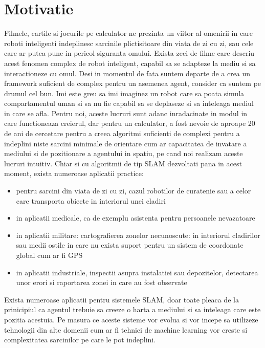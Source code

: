 \documentclass[12pt,a4paper]{report}
\begin{document}
\section{Motivatie}
Filmele, cartile si jocurile pe calculator ne prezinta un viitor al omenirii in care
roboti inteligenti indeplinesc sarcinile plictisitoare din viata de zi cu zi, sau cele 
care ar putea pune in pericol siguranta omului. Exista zeci de filme care descriu 
acest fenomen complex de robot inteligent, capabil sa se adapteze la mediu si sa 
interactioneze cu omul. Desi in momentul de fata suntem departe de a crea un framework 
suficient de complex pentru un asemenea agent, consider ca suntem pe drumul cel bun. 
Imi este greu sa imi imaginez un robot care sa poata simula compartamentul uman si sa 
nu fie capabil sa se deplaseze si sa inteleaga mediul in care se afla. Pentru noi, 
aceste lucruri sunt adanc inradacinate in modul in care functioneaza creierul, dar pentru
un calculator, a fost nevoie de aproape 20 de ani de cercetare pentru a creea algoritmi 
suficienti de complexi pentru a indeplini niste sarcini minimale de orientare cum ar 
capacitatea de invatare a mediului si de pozitionare a agentului in spatiu, pe cand 
noi realizam aceste lucruri intuitiv. Chiar si cu algoritmii de tip SLAM dezvoltati 
pana in acest moment, exista numeroase aplicatii practice: 
\begin{itemize}
    \item pentru sarcini din viata de zi cu zi, cazul robotilor de curatenie sau a celor
care transporta obiecte in interiorul unei cladiri 
    \item in aplicatii medicale, ca de exemplu asistenta pentru persoanele nevazatoare
    \item in aplicatii militare: cartografierea zonelor necunoscute: in interiorul
cladirilor sau medii ostile in care nu exista suport pentru un sistem de coordonate
global cum ar fi GPS  
    \item in aplicatii industriale, inspectii asupra instalatiei sau depozitelor, 
detectarea unor erori si raportarea zonei in care au fost observate    
\end{itemize}
Exista numeroase aplicatii pentru sistemele SLAM, doar toate pleaca de la prinicipiul 
ca agentul trebuie sa creeze o harta a mediului si sa inteleaga care este pozitia acestuia.
Pe masura ce aceste sisteme vor evolua si vor incepe sa utilizeze tehnologii din alte 
domenii cum ar fi tehnici de machine learning vor creste si complexitatea sarcinilor pe 
care le pot indeplini.   
\end{document}

